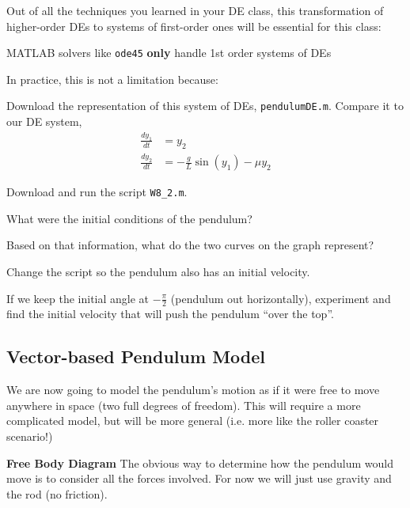 Out of all the techniques you learned in your DE class, this
transformation of higher-order DEs to systems of first-order ones will
be essential for this class:
\begin{center}
MATLAB solvers like \verb#ode45# {\bf only} handle 1st order
  systems of DEs
\end{center}
In practice, this is not a limitation because:

\vfill 

\newpage

\problem Download the representation of this system of DEs,
  \texttt{pendulumDE.m}.  Compare it to our DE system,
\begin{align*}
\frac{d y_1}{dt} & = y_2 \\
\frac{d y_2}{dt} & = -\frac{g}{L}\sin(y_1)  - \mu y_2
\end{align*}
\vsc

\problem Download and run the script \texttt{W8\_2.m}.

\vsc

\problem What were the initial conditions of the pendulum?

\vfill

\problem Based on that information, what do the two curves on the graph
  represent?

\vfill

\newpage

\problem Change the script so the pendulum also has an initial velocity.

\vsc

\problem If we keep the initial angle at $-\frac{\pi}{2}$ (pendulum
  out horizontally), experiment and find the initial velocity that
  will push the pendulum ``over the top''.

\newpage



\newpage

\subsection*{Vector-based Pendulum Model}
We are now going to model the pendulum's motion as if it were free to
move anywhere in space (two full degrees of freedom).  This will
require a more complicated model, but will be more general (i.e. more
like the roller coaster scenario!)

{\bf Free Body Diagram}
The obvious way to determine how the pendulum would move is to
consider all the forces involved.  For now we will just use gravity
and the rod (no friction).

